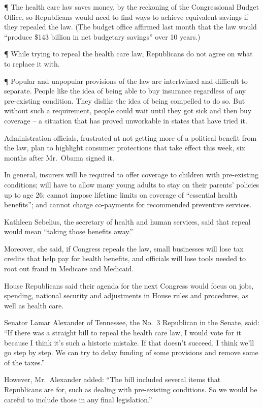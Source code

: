 ﻿\documentclass[12pt]{article}
\begin{document}
¶ The health care law saves money, by the reckoning of the Congressional Budget Office, so
Republicans would need to find ways to achieve equivalent savings if they repealed the law. (The
budget office affirmed last month that the law would ``produce \$143 billion in net budgetary
savings'' over 10 years.)

¶ While trying to repeal the health care law, Republicans do not agree on what to replace it with.

¶ Popular and unpopular provisions of the law are intertwined and difficult to separate. People like
the idea of being able to buy insurance regardless of any pre-existing condition. They dislike the
idea of being compelled to do so. But without such a requirement, people could wait until they got
sick and then buy coverage -- a situation that has proved unworkable in states that have tried it.

Administration officials, frustrated at not getting more of a political benefit from the law, plan
to highlight consumer protections that take effect this week, six months after Mr.~Obama signed it.

In general, insurers will be required to offer coverage to children with pre-existing conditions;
will have to allow many young adults to stay on their parents' policies up to age 26; cannot impose
lifetime limits on coverage of ``essential health benefits''; and cannot charge co-payments for
recommended preventive services.

Kathleen Sebelius, the secretary of health and human services, said that repeal would mean ``taking
those benefits away.''

Moreover, she said, if Congress repeals the law, small businesses will lose tax credits that help
pay for health benefits, and officials will lose tools needed to root out fraud in Medicare and
Medicaid.

House Republicans said their agenda for the next Congress would focus on jobs, spending, national
security and adjustments in House rules and procedures, as well as health care.

Senator Lamar Alexander of Tennessee, the No.~3 Republican in the Senate, said: ``If there was a
straight bill to repeal the health care law, I would vote for it because I think it's such a
historic mistake. If that doesn't succeed, I think we'll go step by step. We can try to delay
funding of some provisions and remove some of the taxes.''

However, Mr.~Alexander added: ``The bill included several items that Republicans are for, such as
dealing with pre-existing conditions. So we would be careful to include those in any final
legislation.''
\end{document}
